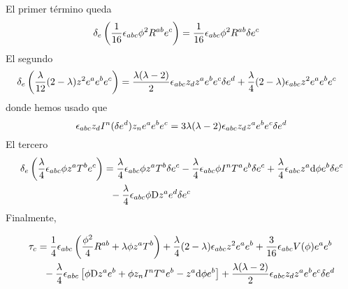 El primer término queda
\begin{align}
  \delta_e\left(\frac{1}{16}\epsilon_{abc}\phi^2R^{ab}e^c\right)&=\frac{1}{16}\epsilon_{abc}\phi^2R^{ab}\delta e^c
\end{align}
El segundo
\begin{align}
  \delta_e\left(\frac{\lambda }{12}(2-\lambda)z^2e^{a}e^be^c\right)&=\frac{\lambda(\lambda-2)}{2}\epsilon_{abc} z_dz^{a}e^be^c\delta e^d+\frac{\lambda}{4}(2-\lambda)\epsilon_{abc} z^2e^{a}e^be^c
\end{align}
donde hemos usado que
\begin{equation}
  \epsilon_{abc} z_dI^n(\delta e^d)z_ne^{a}e^be^c=3\lambda(\lambda-2)\epsilon_{abc} z_dz^{a}e^be^c\delta e^d
\end{equation}
El tercero
\begin{align}
  \delta_e\left(\frac{\lambda}{4}\epsilon_{abc} \phi z^{a}T^be^c\right)&=\frac{\lambda}{4}\epsilon_{abc} \phi z^{a}T^b\delta e^c-\frac{\lambda }{4}\epsilon_{abc} \phi I^nT^{a}e^b\delta e^c+\frac{\lambda}{4}\epsilon_{abc} z^{a}\dd\phi e^b\delta e^c\\&~~-\frac{\lambda}{4}\epsilon_{abc} \phi \mathrm{D} z^{a}e^d\delta e^c
\end{align}
Finalmente,
\begin{tcolorbox}
\begin{align}
  \tau_c&=\frac{1}{4}\epsilon_{abc}\left(\frac{\phi^2}{4}R^{ab}+\lambda\phi z^{a}T^b\right)+\frac{\lambda}{4}(2-\lambda)\epsilon_{abc} z^2e^{a}e^b +\frac{3}{16}\epsilon_{abc} V(\phi )e^{a}e^b\\
  &~~-\frac{\lambda}{4}\epsilon_{abc}\left[\phi \mathrm{D} z^{a}e^b+\phi z_nI^nT^{a}e^b-z^{a}\dd \phi e^b\right]+\frac{\lambda(\lambda-2)}{2}\epsilon_{abc} z_dz^{a}e^be^c\delta e^d
\end{align}
\end{tcolorbox}

















